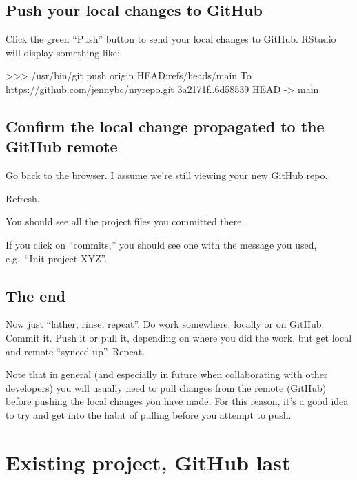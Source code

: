 \documentclass[
]{book}
\newenvironment{Shaded}{\begin{snugshade}}{\end{snugshade}}
\newcommand{\NormalTok}[1]{#1}
\begin{document}
\section{Push your local changes to GitHub}\label{push-your-local-changes-to-github-1}

Click the green ``Push'' button to send your local changes to GitHub.
RStudio will display something like:

\begin{Shaded}
\begin{Highlighting}[]
\NormalTok{\textgreater{}\textgreater{}\textgreater{} /usr/bin/git push origin HEAD:refs/heads/main}
\NormalTok{To https://github.com/jennybc/myrepo.git}
\NormalTok{   3a2171f..6d58539  HEAD {-}\textgreater{} main}
\end{Highlighting}
\end{Shaded}

\section{Confirm the local change propagated to the GitHub remote}\label{confirm-the-local-change-propagated-to-the-github-remote-3}

Go back to the browser.
I assume we're still viewing your new GitHub repo.

Refresh.

You should see all the project files you committed there.

If you click on ``commits,'' you should see one with the message you used, e.g.~``Init project XYZ''.

\section{The end}\label{the-end-1}

Now just ``lather, rinse, repeat''.
Do work somewhere: locally or on GitHub.
Commit it.
Push it or pull it, depending on where you did the work, but get local and remote ``synced up''.
Repeat.

Note that in general (and especially in future when collaborating with other developers) you will usually need to pull changes from the remote (GitHub) before pushing the local changes you have made.
For this reason, it's a good idea to try and get into the habit of pulling before you attempt to push.

\chapter{Existing project, GitHub last}\label{existing-github-last}
\end{document}

